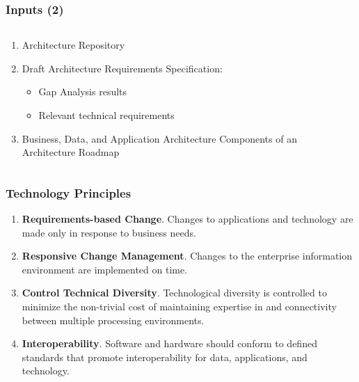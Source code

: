 \documentclass[aspectratio=169, table]{beamer}
\begin{document}
	\begin{frame}
		\frametitle{Inputs (2)}
		\begin{columns}[onlytextwidth]
			\begin{column}{0.5\textwidth}
				\begin{enumerate}
					\item Architecture Repository
					\item Draft Architecture Requirements Specification:
					\begin{itemize}
						\item Gap Analysis results
						\item Relevant technical requirements
					\end{itemize}
					\item Business, Data, and Application Architecture Components of an Architecture Roadmap
				\end{enumerate}
			\end{column}
			\begin{column}{0.5\textwidth}
				
			\end{column}
		\end{columns}
	\end{frame}
	
	\begin{frame}
		\frametitle{Technology Principles}
		\begin{enumerate}
			\item \textbf{Requirements-based Change}.
			Changes to applications and technology are made only in response to business needs.
			\item \textbf{Responsive Change Management}.
			Changes to the enterprise information environment are implemented on time.
			\item  \textbf{Control Technical Diversity}.
			Technological diversity is controlled to minimize the non-trivial cost of maintaining expertise in and connectivity between multiple processing environments.
			\item \textbf{Interoperability}. Software and hardware should conform to defined standards
			that promote interoperability for data, applications, and technology.
		\end{enumerate}
	\end{frame}
	
	
	
\end{document}
